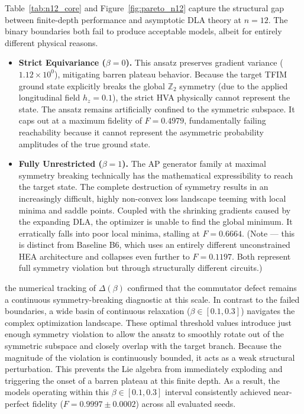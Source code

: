 \documentclass[pdflatex,sn-mathphys-num]{sn-jnl}
\theoremstyle{thmstyleone}
\theoremstyle{thmstyletwo}
\theoremstyle{thmstylethree}
\begin{document}
Table~\ref{tab:n12_core} and Figure~\ref{fig:pareto_n12} capture the structural gap between finite-depth performance and asymptotic DLA theory at $n=12$. The binary boundaries both fail to produce acceptable models, albeit for entirely different physical reasons.
\begin{itemize}
    \item \textbf{Strict Equivariance ($\beta=0$).} This ansatz preserves gradient variance ($1.12 \times 10^0$), mitigating barren plateau behavior. Because the target TFIM ground state explicitly breaks the global $\mathbb{Z}_2$ symmetry (due to the applied longitudinal field $h_z=0.1$), the strict HVA physically cannot represent the state. The ansatz remains artificially confined to the symmetric subspace. It caps out at a maximum fidelity of $F=0.4979$, fundamentally failing reachability because it cannot represent the asymmetric probability amplitudes of the true ground state.
    \item \textbf{Fully Unrestricted ($\beta=1$).} The AP generator family at maximal symmetry breaking technically has the mathematical expressibility to reach the target state. The complete destruction of symmetry results in an increasingly difficult, highly non-convex loss landscape teeming with local minima and saddle points. Coupled with the shrinking gradients caused by the expanding DLA, the optimizer is unable to find the global minimum. It erratically falls into poor local minima, stalling at $F=0.6664$. (Note --- this is distinct from Baseline B6, which uses an entirely different unconstrained HEA architecture and collapses even further to $F=0.1197$. Both represent full symmetry violation but through structurally different circuits.)
\end{itemize}


the numerical tracking of $\Delta(\beta)$ confirmed that the commutator defect remains a continuous symmetry-breaking diagnostic at this scale. In contrast to the failed boundaries, a wide basin of continuous relaxation ($\beta \in [0.1, 0.3]$) navigates the complex optimization landscape. These optimal threshold values introduce just enough symmetry violation to allow the ansatz to smoothly rotate out of the symmetric subspace and closely overlap with the target branch. Because the magnitude of the violation is continuously bounded, it acts as a weak structural perturbation. This prevents the Lie algebra from immediately exploding and triggering the onset of a barren plateau at this finite depth. As a result, the models operating within this $\beta \in [0.1, 0.3]$ interval consistently achieved near-perfect fidelity ($F=0.9997 \pm 0.0002$) across all evaluated seeds.
\end{document}
